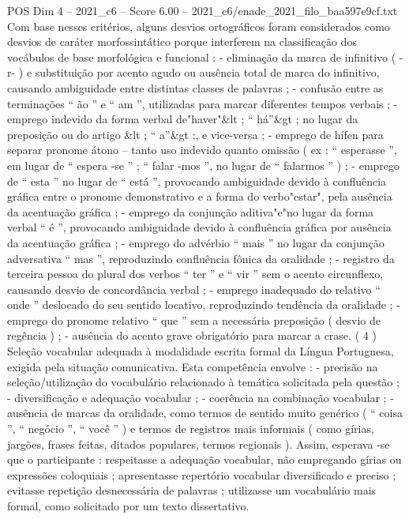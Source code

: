 \begin{textsample}{POS Dim 4 – 2021\_c6 – Score 6.00 – 2021\_c6/enade\_2021\_filo\_baa597e9cf.txt}
Com base nesses critérios, alguns desvios ortográficos foram considerados como desvios de caráter morfossintático porque interferem na classificação dos vocábulos de base morfológica e funcional : - eliminação da marca de infinitivo ( -r- ) e substituição por acento agudo ou ausência total de marca do infinitivo, causando ambiguidade entre distintas classes de palavras ; - confusão entre as terminações “ ão ” e “ am ”, utilizadas para marcar diferentes tempos verbais ; - emprego indevido da forma verbal de"haver"\&lt ; “ há”\&gt ; no lugar da preposição ou do artigo \&lt ; “ a”\&gt ;, e vice-versa ; - emprego de hífen para separar pronome átono – tanto uso indevido quanto omissão ( ex : “ esperasse ”, em lugar de “ espera -se ” ; “ falar -mos ”, no lugar de “ falarmos ” ) ; - emprego de “ esta ” no lugar de “ está ”, provocando ambiguidade devido à confluência gráfica entre o pronome demonstrativo e a forma do verbo"estar", pela ausência da acentuação gráfica ; - emprego da conjunção aditiva"e"no lugar da forma verbal “ é ”, provocando ambiguidade devido à confluência gráfica por ausência da acentuação gráfica ; - emprego do advérbio “ mais ” no lugar da conjunção adversativa “ mas ”, reproduzindo confluência fônica da oralidade ; - registro da terceira pessoa do plural dos verbos “ ter ” e “ vir ” sem o acento circunflexo, causando desvio de concordância verbal ; - emprego inadequado do relativo “ onde ” deslocado do seu sentido locativo, reproduzindo tendência da oralidade ; - emprego do pronome relativo “ que ” sem a necessária preposição ( desvio de regência ) ; - ausência do acento grave obrigatório para marcar a crase. ( 4 ) Seleção vocabular adequada à modalidade escrita formal da Língua Portuguesa, exigida pela situação comunicativa.
Esta competência envolve : - precisão na seleção/utilização do vocabulário relacionado à temática solicitada pela questão ; - diversificação e adequação vocabular ; - coerência na combinação vocabular ; - ausência de marcas da oralidade, como termos de sentido muito genérico ( “ coisa ”, “ negócio ”, “ você ” ) e termos de registros mais informais ( como gírias, jargões, frases feitas, ditados populares, termos regionais ).
Assim, esperava -se que o participante : respeitasse a adequação vocabular, não empregando gírias ou expressões coloquiais ; apresentasse repertório vocabular diversificado e preciso ; evitasse repetição desnecessária de palavras ; utilizasse um vocabulário mais formal, como solicitado por um texto dissertativo.

\end{textsample}
